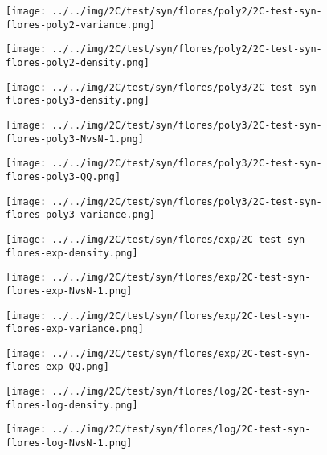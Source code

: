 \begin{figure}[H]
\centering	\texttt{[image: ../../img/2C/test/syn/flores/poly2/2C-test-syn-flores-poly2-variance.png]}
\end{figure}
\begin{figure}[H]
\centering	\texttt{[image: ../../img/2C/test/syn/flores/poly2/2C-test-syn-flores-poly2-density.png]}
\end{figure}
\begin{figure}[H]
\centering	\texttt{[image: ../../img/2C/test/syn/flores/poly3/2C-test-syn-flores-poly3-density.png]}
\end{figure}
\begin{figure}[H]
\centering	\texttt{[image: ../../img/2C/test/syn/flores/poly3/2C-test-syn-flores-poly3-NvsN-1.png]}
\end{figure}
\begin{figure}[H]
\centering	\texttt{[image: ../../img/2C/test/syn/flores/poly3/2C-test-syn-flores-poly3-QQ.png]}
\end{figure}
\begin{figure}[H]
\centering	\texttt{[image: ../../img/2C/test/syn/flores/poly3/2C-test-syn-flores-poly3-variance.png]}
\end{figure}
\begin{figure}[H]
\centering	\texttt{[image: ../../img/2C/test/syn/flores/exp/2C-test-syn-flores-exp-density.png]}
\end{figure}
\begin{figure}[H]
\centering	\texttt{[image: ../../img/2C/test/syn/flores/exp/2C-test-syn-flores-exp-NvsN-1.png]}
\end{figure}
\begin{figure}[H]
\centering	\texttt{[image: ../../img/2C/test/syn/flores/exp/2C-test-syn-flores-exp-variance.png]}
\end{figure}
\begin{figure}[H]
\centering	\texttt{[image: ../../img/2C/test/syn/flores/exp/2C-test-syn-flores-exp-QQ.png]}
\end{figure}
\begin{figure}[H]
\centering	\texttt{[image: ../../img/2C/test/syn/flores/log/2C-test-syn-flores-log-density.png]}
\end{figure}
\begin{figure}[H]
\centering	\texttt{[image: ../../img/2C/test/syn/flores/log/2C-test-syn-flores-log-NvsN-1.png]}
\end{figure}

